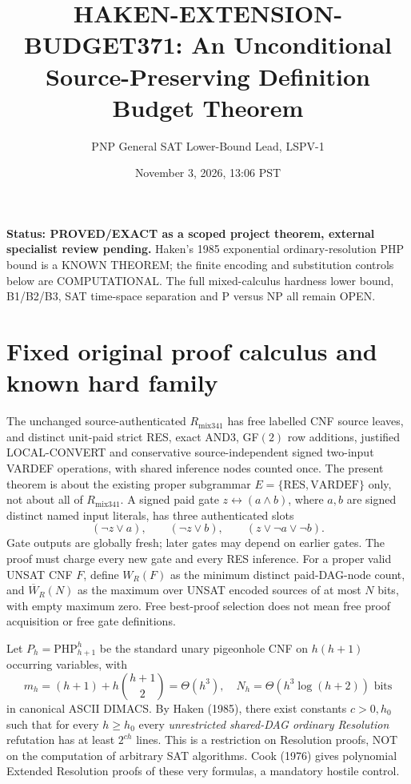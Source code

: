 \documentclass[11pt]{article}
\title{HAKEN-EXTENSION-BUDGET371: An Unconditional Source-Preserving Definition Budget Theorem}
\author{PNP General SAT Lower-Bound Lead, LSPV-1}
\date{November 3, 2026, 13:06 PST}
\begin{document}
\maketitle

\noindent\textbf{Status: PROVED/EXACT as a scoped project theorem, external specialist review pending.}
Haken's 1985 exponential ordinary-resolution PHP bound is a KNOWN THEOREM; the finite encoding and substitution controls below are COMPUTATIONAL. The full mixed-calculus hardness lower bound, B1/B2/B3, SAT time-space separation and P versus NP all remain OPEN.

\section*{Fixed original proof calculus and known hard family}
The unchanged source-authenticated $R_{\mathrm{mix341}}$ has free labelled CNF source leaves, and distinct unit-paid strict RES, exact AND3, GF$(2)$ row additions, justified LOCAL-CONVERT and conservative source-independent signed two-input VARDEF operations, with shared inference nodes counted once. The present theorem is about the existing proper subgrammar $E=\{\mathrm{RES},\mathrm{VARDEF}\}$ only, not about all of $R_{\mathrm{mix341}}$. A signed paid gate $z\leftrightarrow(a\land b)$, where $a,b$ are signed distinct named input literals, has three authenticated slots
\[
(\neg z\vee a),\qquad(\neg z\vee b),\qquad(z\vee\neg a\vee\neg b).
\]
Gate outputs are globally fresh; later gates may depend on earlier gates. The proof must charge every new gate and every RES inference. For a proper valid UNSAT CNF $F$, define $W_R(F)$ as the minimum distinct paid-DAG-node count, and $\overline W_R(N)$ as the maximum over UNSAT encoded sources of at most $N$ bits, with empty maximum zero. Free best-proof selection does not mean free proof acquisition or free gate definitions.

Let $P_h=\mathrm{PHP}_{h+1}^{h}$ be the standard unary pigeonhole CNF on $h(h+1)$ occurring variables, with
\[
m_h=(h+1)+h\binom{h+1}{2}=\Theta(h^3),
\quad N_h=\Theta(h^3\log(h+2))\text{ bits}
\]
in canonical ASCII DIMACS. By Haken (1985), there exist constants $c>0,h_0$ such that for every $h\ge h_0$ every \emph{unrestricted shared-DAG ordinary Resolution} refutation has at least $2^{ch}$ lines. This is a restriction on Resolution proofs, NOT on the computation of arbitrary SAT algorithms. Cook (1976) gives polynomial Extended Resolution proofs of these very formulas, a mandatory hostile control.
\end{document}
